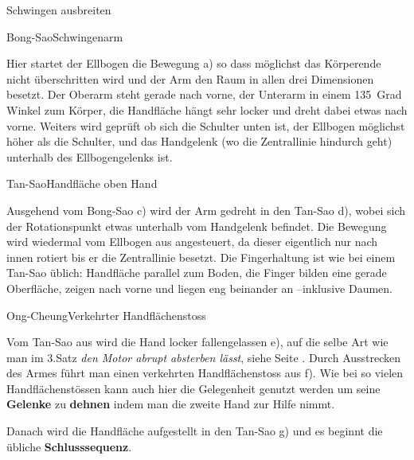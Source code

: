 \begin{WTSatz}{Schwingen ausbreiten}%

	
	\begin{WTSatzTeil}{Bong-Sao}{Schwingenarm}
		
		Hier startet der Ellbogen die Bewegung a) so dass m\"oglichst das K\"orperende nicht \"uberschritten wird und der Arm den Raum in allen drei Dimensionen besetzt. Der Oberarm steht gerade nach vorne, der Unterarm in einem 135~Grad Winkel zum K\"orper, die Handfl\"ache h\"angt sehr locker und dreht dabei etwas nach vorne. Weiters wird gepr\"uft ob sich die Schulter unten ist, der Ellbogen m\"oglichst h\"oher als die Schulter, und das Handgelenk (wo die Zentrallinie hindurch geht) unterhalb des Ellbogengelenks ist.
		
	\end{WTSatzTeil}
	\begin{WTSatzTeil}{Tan-Sao}{Handfl\"ache oben Hand}
		
		Ausgehend vom Bong-Sao c) wird der Arm gedreht in den Tan-Sao d), wobei sich der Rotationspunkt etwas unterhalb vom Handgelenk befindet. Die Bewegung wird wiedermal vom Ellbogen aus angesteuert, da dieser eigentlich nur nach innen rotiert bis er die Zentrallinie besetzt.
		Die Fingerhaltung ist wie bei einem Tan-Sao \"ublich: Handfl\"ache parallel zum Boden, die Finger bilden eine gerade Oberfl\"ache, zeigen nach vorne und liegen eng beinander an --inklusive Daumen.
		
	\end{WTSatzTeil}
	\begin{WTSatzTeil}{Ong-Cheung}{Verkehrter Handfl\"achenstoss}
		
		Vom Tan-Sao aus wird die Hand locker fallengelassen e), auf die selbe Art wie man im 3.Satz \textit{den Motor abrupt absterben l\"asst}, siehe Seite \pageref{LBL_motorabsterben}. Durch Ausstrecken des Armes f\"uhrt man einen verkehrten Handfl\"achenstoss aus f). Wie bei so vielen Handfl\"achenst\"ossen kann auch hier die Gelegenheit genutzt werden um seine \textbf{Gelenke} zu \textbf{dehnen} indem man die zweite Hand zur Hilfe nimmt.
		
		Danach wird die Handfl\"ache aufgestellt in den Tan-Sao g) und es beginnt die \"ubliche \textbf{Schlusssequenz}.
	\end{WTSatzTeil}
\end{WTSatz}

